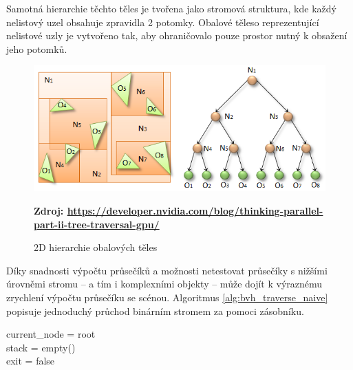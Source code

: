 Samotná hierarchie těchto těles je tvořena jako stromová struktura, kde každý nelistový uzel obsahuje zpravidla 2 potomky. Obalové těleso reprezentující nelistové uzly je vytvořeno tak, aby ohraničovalo pouze prostor nutný k obsažení jeho potomků.

\begin{figure}[H]
	\centering
	\includegraphics[scale=0.5]{images/fig03-bvh.png}
	\caption{2D hierarchie obalových těles}
	\textbf{Zdroj: \url{https://developer.nvidia.com/blog/thinking-parallel-part-ii-tree-traversal-gpu/}}
	\label{fig:slabs}
\end{figure}

Díky snadnosti výpočtu průsečíků a možnosti netestovat průsečíky s nižšími úrovněmi stromu -- a tím i komplexními objekty -- může dojít k výraznému zrychlení výpočtu průsečíku se scénou. Algoritmus \ref{alg:bvh_traverse_naive} popisuje jednoduchý průchod binárním stromem za pomoci zásobníku.

\begin{center}
	\begin{czechalgorithm}[H] \label{alg:bvh_traverse_naive}
		current\_node = root\\
		stack = empty()\\
		exit = false\\
		 {\\
		}\\
		\caption{Průchod BVH stromem pro ray tracing \cite{Vaidyanathan2019WideBT}}
	\end{czechalgorithm}
\end{center}



